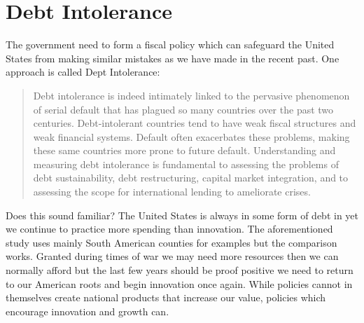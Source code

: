 \documentclass[pdflatex,12pt,a4paper]{report}
\begin{document}
\section{Debt Intolerance}
\begin{doublespace}
The government need to form a fiscal policy which can safeguard the United States from making similar mistakes as we have made in the recent past. One approach is called Dept Intolerance: ~\cite{reinhart2003debt}
\end{doublespace}
\begin{quotation}
Debt intolerance is indeed intimately linked to the pervasive phenomenon of
serial default that has plagued so many countries over the past two centuries. Debt-intolerant
countries tend to have weak fiscal structures and weak financial systems. Default often
exacerbates these problems, making these same countries more prone to future default.
Understanding and measuring debt intolerance is fundamental to assessing the problems of debt
sustainability, debt restructuring, capital market integration, and to assessing the scope for
international lending to ameliorate crises.
\end{quotation}
\begin{doublespace}
Does this sound familiar? The United States is always in some form of debt in yet we continue to practice more spending than innovation. The aforementioned study uses mainly South American counties for examples but the comparison works. Granted during times of war we may need more resources then we can normally afford but the last few years should be proof positive we need to return to our American roots and begin innovation once again. While policies cannot in themselves create national products that increase our value, policies which encourage innovation and growth can. 
\end{doublespace}
\end{document}
